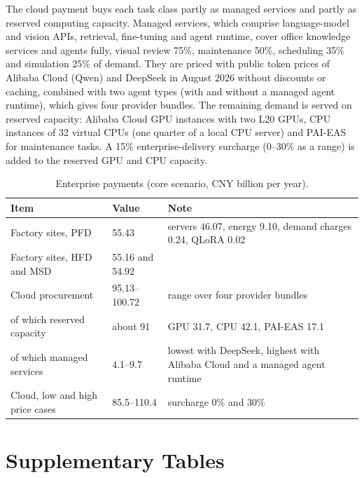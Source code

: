 \documentclass[11pt]{article}
\renewcommand{\thetable}{M\arabic{table}}
\begin{document}
The cloud payment buys each task class partly as managed services and partly as reserved computing capacity. Managed services, which comprise language-model and vision APIs, retrieval, fine-tuning and agent runtime, cover office knowledge services and agents fully, visual review 75\%, maintenance 50\%, scheduling 35\% and simulation 25\% of demand. They are priced with public token prices of Alibaba Cloud (Qwen) and DeepSeek in August 2026 without discounts or caching, combined with two agent types (with and without a managed agent runtime), which gives four provider bundles. The remaining demand is served on reserved capacity: Alibaba Cloud GPU instances with two L20 GPUs, CPU instances of 32 virtual CPUs (one quarter of a local CPU server) and PAI-EAS for maintenance tasks. A 15\% enterprise-delivery surcharge (0--30\% as a range) is added to the reserved GPU and CPU capacity.

\begin{table}[H]
\centering\small
\caption{Enterprise payments (core scenario, CNY billion per year).}\label{tab:payments}
\begin{tabular}{@{}L{0.42\textwidth}L{0.24\textwidth}L{0.28\textwidth}@{}}
\toprule
Item & Value & Note \\
\midrule
Factory sites, PFD & 55.43 & servers 46.07, energy 9.10, demand charges 0.24, QLoRA 0.02 \\
Factory sites, HFD and MSD & 55.16 and 54.92 & \\
Cloud procurement & 95.13--100.72 & range over four provider bundles \\
\quad of which reserved capacity & about 91 & GPU 31.7, CPU 42.1, PAI-EAS 17.1 \\
\quad of which managed services & 4.1--9.7 & lowest with DeepSeek, highest with Alibaba Cloud and a managed agent runtime \\
Cloud, low and high price cases & 85.5--110.4 & surcharge 0\% and 30\% \\
\bottomrule
\end{tabular}
\end{table}

\clearpage
\section*{Supplementary Tables}
\renewcommand{\thetable}{S\arabic{table}}
\setcounter{table}{0}
\end{document}
